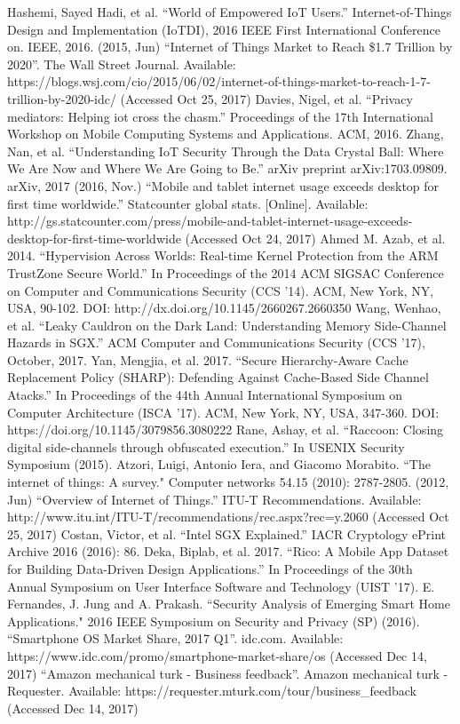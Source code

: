 Hashemi, Sayed Hadi, et al. ``World of Empowered IoT Users.'' Internet-of-Things Design and Implementation (IoTDI), 2016 IEEE First International Conference on. IEEE, 2016.
 (2015, Jun) ``Internet of Things Market to Reach \$1.7 Trillion by 2020''. The Wall Street Journal. Available: https://blogs.wsj.com/cio/2015/06/02/internet-of-things-market-to-reach-1-7-trillion-by-2020-idc/ (Accessed Oct 25, 2017)
 Davies, Nigel, et al. ``Privacy mediators: Helping iot cross the chasm.'' Proceedings of the 17th International Workshop on Mobile Computing Systems and Applications. ACM, 2016.
 Zhang, Nan, et al. ``Understanding IoT Security Through the Data Crystal Ball: Where We Are Now and Where We Are Going to Be.'' arXiv preprint arXiv:1703.09809. arXiv, 2017
 (2016, Nov.) ``Mobile and tablet internet usage exceeds desktop for first time worldwide.'' Statcounter global stats. [Online]. Available: http://gs.statcounter.com/press/mobile-and-tablet-internet-usage-exceeds-desktop-for-first-time-worldwide (Accessed Oct 24, 2017)
 Ahmed M. Azab, et al. 2014. ``Hypervision Across Worlds: Real-time Kernel Protection from the ARM TrustZone Secure World.'' In Proceedings of the 2014 ACM SIGSAC Conference on Computer and Communications Security (CCS '14). ACM, New York, NY, USA, 90-102. DOI: http://dx.doi.org/10.1145/2660267.2660350
 Wang, Wenhao, et al. ``Leaky Cauldron on the Dark Land: Understanding Memory Side-Channel Hazards in SGX.'' ACM Computer and Communications Security (CCS ’17), October, 2017.
 Yan, Mengjia, et al. 2017. ``Secure Hierarchy-Aware Cache Replacement Policy (SHARP): Defending Against Cache-Based Side Channel Atacks.'' In Proceedings of the 44th Annual International Symposium on Computer Architecture (ISCA '17). ACM, New York, NY, USA, 347-360. DOI: https://doi.org/10.1145/3079856.3080222
 Rane, Ashay, et al. ``Raccoon: Closing digital side-channels through obfuscated execution.'' In USENIX Security Symposium (2015).
 Atzori, Luigi, Antonio Iera, and Giacomo Morabito. ``The internet of things: A survey." Computer networks 54.15 (2010): 2787-2805.
 (2012, Jun) ``Overview of Internet of Things.'' ITU-T Recommendations. Available: http://www.itu.int/ITU-T/recommendations/rec.aspx?rec=y.2060 (Accessed Oct 25, 2017)
 Costan, Victor, et al. ``Intel SGX Explained.'' IACR Cryptology ePrint Archive 2016 (2016): 86.
 Deka, Biplab, et al. 2017. ``Rico: A Mobile App Dataset for Building Data-Driven Design Applications.'' In Proceedings of the 30th Annual Symposium on User Interface Software and Technology (UIST '17).
 E. Fernandes, J. Jung and A. Prakash. ``Security Analysis of Emerging Smart Home Applications." 2016 IEEE Symposium on Security and Privacy (SP) (2016).
 ``Smartphone OS Market Share, 2017 Q1''. idc.com. Available: https://www.idc.com/promo/smartphone-market-share/os (Accessed Dec 14, 2017)
 ``Amazon mechanical turk - Business feedback''. Amazon mechanical turk - Requester. Available: https://requester.mturk.com/tour/business\_feedback (Accessed Dec 14, 2017)
